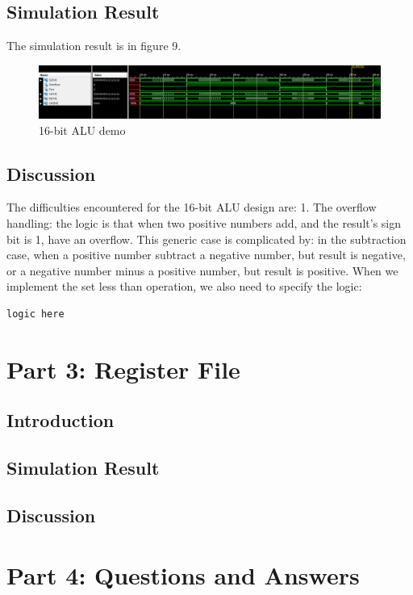 \documentclass{article}
\begin{document}
\subsection{Simulation Result}

The simulation result is in figure 9.
\begin{figure}[!htb]
  \centering
  \includegraphics[width=\linewidth]{lab1-2.PNG}
  \caption{16-bit ALU demo}
  \label{fig:16-ALU demo}
\end{figure}



\subsection{Discussion}
The difficulties encountered for the 16-bit ALU design are: 
1. The overflow handling: the logic is that when two positive numbers add, and the result's sign bit is 1, have an overflow. This generic case is complicated by: in the subtraction case, when a positive number subtract a negative number, but result is negative, or a negative number minus a positive number, but result is positive. When we implement the set less than operation, we also need to specify the logic: 
\begin{verbatim}
logic here
\end{verbatim}


\section{Part 3: Register File }
\subsection{Introduction}

\subsection{Simulation Result}

\subsection{Discussion}



\section{Part 4: Questions and Answers}
\end{document}

